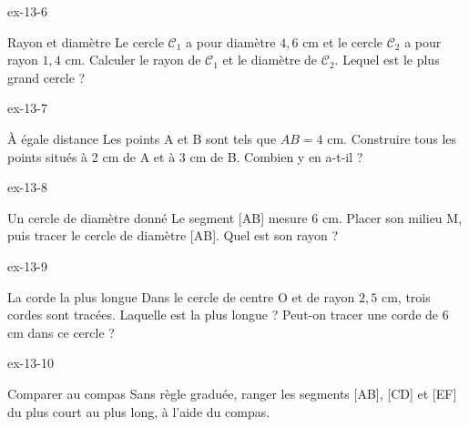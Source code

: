 \begin{blocLivre}{ex-13-6}\begin{exercice}[2]{Rayon et diamètre}
Le cercle $\mathcal C_1$ a pour diamètre $4{,}6$ cm et le cercle $\mathcal C_2$ a pour rayon $1{,}4$ cm. Calculer le rayon de $\mathcal C_1$ et le diamètre de $\mathcal C_2$. Lequel est le plus grand cercle ?
\label{fig-ex-13-6}
\end{exercice}\end{blocLivre}
\begin{blocLivre}{ex-13-7}\begin{exercice}[2]{À égale distance}
Les points A et B sont tels que $AB=4$ cm. Construire tous les points situés à 2 cm de A et à 3 cm de B. Combien y en a-t-il ?
\label{fig-ex-13-7}
\end{exercice}\end{blocLivre}
\begin{blocLivre}{ex-13-8}\begin{exercice}[2]{Un cercle de diamètre donné}
Le segment [AB] mesure 6 cm. Placer son milieu M, puis tracer le cercle de diamètre [AB]. Quel est son rayon ?
\label{fig-ex-13-8}
\end{exercice}\end{blocLivre}
\begin{blocLivre}{ex-13-9}\begin{exercice}[2]{La corde la plus longue}
Dans le cercle de centre O et de rayon $2{,}5$ cm, trois cordes sont tracées. Laquelle est la plus longue ? Peut-on tracer une corde de 6 cm dans ce cercle ?
\label{fig-ex-13-9}
\end{exercice}\end{blocLivre}
\begin{blocLivre}{ex-13-10}\begin{exercice}[2]{Comparer au compas}
Sans règle graduée, ranger les segments [AB], [CD] et [EF] du plus court au plus long, à l’aide du compas.
\label{fig-ex-13-10}
\end{exercice}\end{blocLivre}


